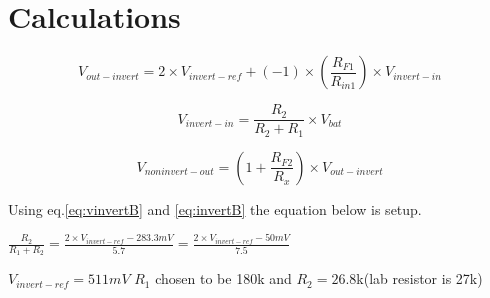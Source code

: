      \chapter{Calculations}
     \label{ch:calcA6}
     
     \begin{equation}
V_{out-invert}=2\times V_{invert-ref}+(-1)\times (\frac{R_{F1}}{R_{in1}})\times V_{invert-in}
    \label{eq:invertB}
\end{equation}

\begin{equation}
    V_{invert-in}=\frac{R_2}{R_2+R_1}\times V_{bat}
    \label{eq:vinvertB}
\end{equation}

\begin{equation}
V_{non invert-out}= (1+\frac{R_{F2}}{R_{x}})\times V_{out-invert}
    \label{eq:noninvertB}
\end{equation}
     
     
     \centering Using eq.\ref{eq:vinvertB} and \ref{eq:invertB} the equation below is setup.
     \begin{center}
         $\frac{R_2}{R_1+R_2}=\frac{2\times V_{invert-ref} -283.3mV }{5.7}=\frac{2\times V_{invert-ref} -50mV }{7.5}$
     \end{center}
     \centering $V_{invert-ref}=511mV$
     \centering $R_1$ chosen to be 180k and $R_2=26.8$k\textohm(lab resistor is 27k\textohm)





